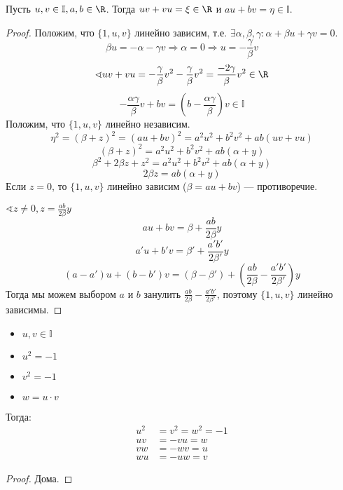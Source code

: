\begin{lemma}
	Пусть \(u, v \in \mathbb{I}, a, b \in \R\). Тогда \(uv + vu = \xi \in \R\) и \(au + bv = \eta \in \mathbb{I}\).
\end{lemma}
\begin{proof}
	Положим, что \(\{1, u, v\}\) линейно зависим, т.е. \(\exists \alpha, \beta, \gamma : \alpha + \beta u + \gamma v = 0\).
	\[\beta u = - \alpha - \gamma v \Rightarrow \alpha = 0 \Rightarrow u = - \frac{\gamma}{\beta} v\]
	\[\sphericalangle uv + vu = - \frac{\gamma}{\beta}v^2 - \frac{\gamma}{\beta}v^2 = \frac{-2\gamma}{\beta}v^2 \in \R\]
	\[- \frac{\alpha \gamma}{\beta} v + bv = \left(b - \frac{\alpha\gamma}{\beta}\right)v \in \mathbb{I}\]
	Положим, что \(\{1, u, v\}\) линейно независим.
	\[\eta^2 = (\beta + z)^2 = (au + bv)^2 = a^2u^2 + b^2v^2 + ab(uv + vu)\]
	\[(\beta + z)^2 = a^2u^2 + b^2v^2 + ab(\alpha + y)\]
	\[\beta^2 + 2\beta z + z^2 = a^2u^2 + b^2v^2 + ab(\alpha + y)\]
	\[2\beta z = ab(\alpha + y)\]
	Если \(z = 0\), то \(\{1, u, v\}\) линейно зависим (\(\beta = au + bv\)) --- противоречие.

	\(\sphericalangle z \neq 0, z = \frac{ab}{2\beta} y\)
	\[au + bv = \beta + \frac{ab}{2 \beta}y\]
	\[a'u + b'v = \beta' + \frac{a'b'}{2 \beta'}y\]
    \[(a-a')u + (b-b')v = (\beta - \beta') + \left(\frac{ab}{2 \beta} - \frac{a'b'}{2 \beta'}\right)y\]
    Тогда мы можем выбором \(a\) и \(b\) занулить \(\frac{ab}{2 \beta} - \frac{a'b'}{2 \beta'}\), поэтому \(\{1, u, v\}\) линейно зависимы.
	\unfinished
\end{proof}

\begin{lemma}\itemfix
	\begin{itemize}
		\item \(u, v \in \mathbb{I}\)
		\item \(u^2 = - 1\)
		\item \(v^2 = - 1\)
		\item \(w = u \cdot v\)
	\end{itemize}

	Тогда:
	\begin{align*}
		u^2 & = v^2 = w^2 = - 1 \\
		uv  & = - vu = w        \\
		vw  & = - wv = u        \\
		wu  & = - uw = v
	\end{align*}
\end{lemma}
\begin{proof}
    Дома. 
\end{proof}

